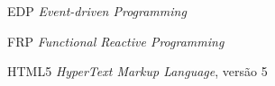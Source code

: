 \begin{siglas}
  \item[EDP] \emph{Event-driven Programming}
  \item[FRP] \emph{Functional Reactive Programming}
  \item[HTML5] \emph{HyperText Markup Language}, versão 5
\end{siglas}
